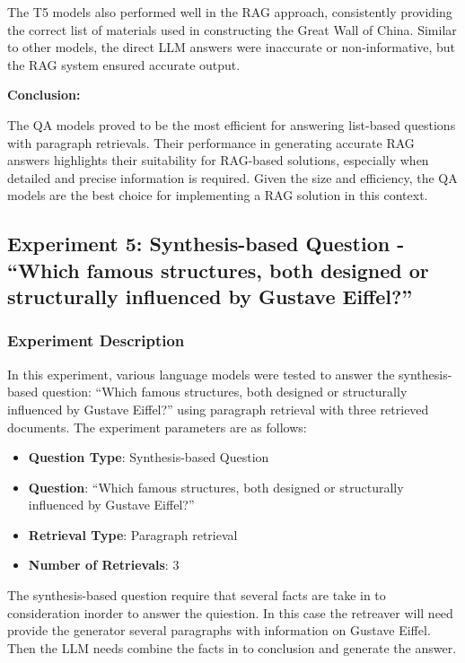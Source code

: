 \documentclass{wseas}
\begin{document}
The T5 models also performed well in the RAG approach, consistently
providing the correct list of materials used in constructing the Great
Wall of China. Similar to other models, the direct LLM answers were
inaccurate or non-informative, but the RAG system ensured accurate
output.

\textbf{Conclusion:}

The QA models proved to be the most efficient for answering list-based
questions with paragraph retrievals. Their performance in generating
accurate RAG answers highlights their suitability for RAG-based
solutions, especially when detailed and precise information is required.
Given the size and efficiency, the QA models are the best choice for
implementing a RAG solution in this context.


\subsection{Experiment 5: Synthesis-based Question - ``Which famous
structures, both designed or structurally influenced by Gustave
Eiffel?''}

\subsubsection{Experiment Description}

In this experiment, various language models were tested to answer the
synthesis-based question: ``Which famous structures, both designed or
structurally influenced by Gustave Eiffel?'' using paragraph retrieval
with three retrieved documents. The experiment parameters are as
follows:

\begin{itemize}

\item
  \textbf{Question Type}: Synthesis-based Question
\item
  \textbf{Question}: ``Which famous structures, both designed or
  structurally influenced by Gustave Eiffel?''
\item
  \textbf{Retrieval Type}: Paragraph retrieval
\item
  \textbf{Number of Retrievals}: 3
\end{itemize}

The synthesis-based question require that several facts are take in to
consideration inorder to answer the quiestion. In this case the
retreaver will need provide the generator several paragraphs with
information on Gustave Eiffel. Then the LLM needs combine the facts in
to conclusion and generate the answer.
\end{document}
